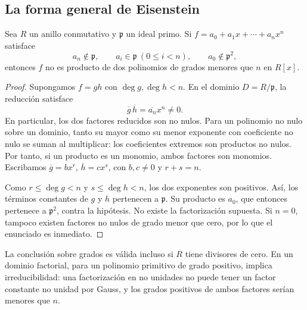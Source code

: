 \subsection{La forma general de Eisenstein}\label{tema:19-3-3}
\begin{prop}\label{prop:C19-Eisenstein}
Sea $R$ un anillo conmutativo y $\mathfrak p$ un ideal primo. Si $f=a_0+a_1x+\cdots+a_nx^n$ satisface
\[
a_n\notin\mathfrak p,\qquad
a_i\in\mathfrak p\ (0\leq i<n),\qquad
a_0\notin\mathfrak p^2,
\]
entonces $f$ no es producto de dos polinomios de grados menores que $n$ en $R[x]$.
\end{prop}
\begin{proof}
Supongamos $f=gh$ con $\deg g,\deg h<n$. En el dominio $D=R/\mathfrak p$, la reducción satisface
\[
\overline g\,\overline h=\overline{a_n}x^n\ne0.
\]
En particular, los dos factores reducidos son no nulos. Para un polinomio no nulo sobre un dominio, tanto su mayor como su menor exponente con coeficiente no nulo se suman al multiplicar: los coeficientes extremos son productos no nulos. Por tanto, si un producto es un monomio, ambos factores son monomios. Escribamos $\overline g=bx^r$, $\overline h=cx^s$, con $b,c\ne0$ y $r+s=n$.

Como $r\leq\deg g<n$ y $s\leq\deg h<n$, los dos exponentes son positivos. Así, los términos constantes de $g$ y $h$ pertenecen a $\mathfrak p$. Su producto es $a_0$, que entonces pertenece a $\mathfrak p^2$, contra la hipótesis. No existe la factorización supuesta. Si $n=0$, tampoco existen factores no nulos de grado menor que cero, por lo que el enunciado es inmediato.
\end{proof}
La conclusión sobre grados es válida incluso si $R$ tiene divisores de cero. En un dominio factorial, para un polinomio primitivo de grado positivo, implica irreducibilidad: una factorización en no unidades no puede tener un factor constante no unidad por Gauss, y los grados positivos de ambos factores serían menores que $n$.

